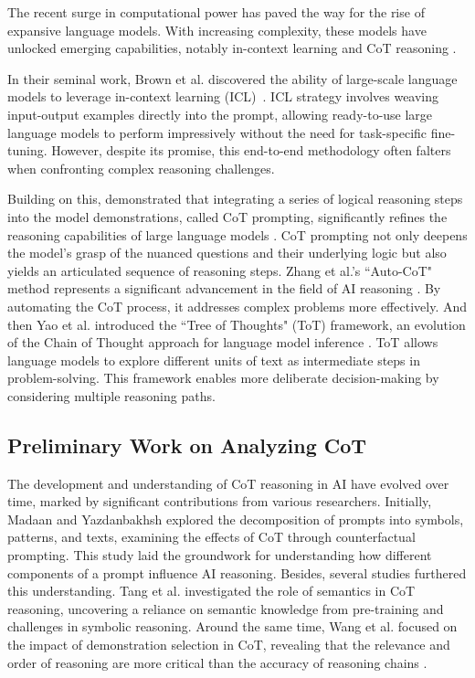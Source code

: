 \documentclass[11pt]{article}
\begin{document}
The recent surge in computational power has paved the way for the rise of expansive language models. With increasing complexity, these models have unlocked emerging capabilities, notably in-context learning and CoT reasoning \cite{wei2022chain,brown2020language,schaeffer2023emergent}.

In their seminal work, Brown et al. discovered the ability of large-scale language models to leverage in-context learning (ICL)~\cite{brown2020language}. ICL strategy involves weaving input-output examples directly into the prompt, allowing ready-to-use large language models to perform impressively without the need for task-specific fine-tuning. However, despite its promise, this end-to-end methodology often falters when confronting complex reasoning challenges.

Building on this, \citeauthor{wei2022chain} demonstrated that integrating a series of logical reasoning steps into the model demonstrations, called CoT prompting, significantly refines the reasoning capabilities of large language models \cite{wei2022chain}. CoT prompting not only deepens the model's grasp of the nuanced questions and their underlying logic but also yields an articulated sequence of reasoning steps. Zhang et al.'s ``Auto-CoT" method represents a significant advancement in the field of AI reasoning \cite{zhang2022automatic}. By automating the CoT process, it addresses complex problems more effectively.
%
And then Yao et al. introduced the ``Tree of Thoughts" (ToT) framework, an evolution of the Chain of Thought approach for language model inference \cite{yao2023tree}. ToT allows language models to explore different units of text as intermediate steps in problem-solving. This framework enables more deliberate decision-making by considering multiple reasoning paths.
%

\phantom{Invisible Text}
\vspace{-\baselineskip}

\subsection{Preliminary Work on Analyzing CoT}

The development and understanding of CoT reasoning in AI have evolved over time, marked by significant contributions from various researchers. Initially, Madaan and Yazdanbakhsh \cite{madaan2022text} explored the decomposition of prompts into symbols, patterns, and texts, examining the effects of CoT through counterfactual prompting. This study laid the groundwork for understanding how different components of a prompt influence AI reasoning.
Besides, several studies furthered this understanding. Tang et al. \cite{tang2023large} investigated the role of semantics in CoT reasoning, uncovering a reliance on semantic knowledge from pre-training and challenges in symbolic reasoning. Around the same time, Wang et al. focused on the impact of demonstration selection in CoT, revealing that the relevance and order of reasoning are more critical than the accuracy of reasoning chains \cite{wang2023selfconsistency}.
\end{document}
